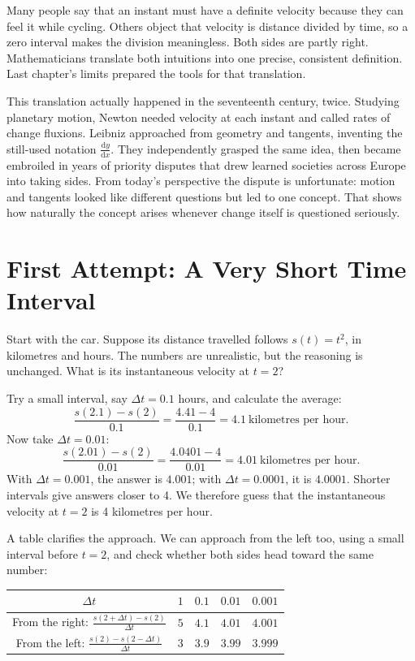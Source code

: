 Many people say that an instant must have a definite velocity because they can feel it while cycling. Others object that velocity is distance divided by time, so a zero interval makes the division meaningless. Both sides are partly right. Mathematicians translate both intuitions into one precise, consistent definition. Last chapter's limits prepared the tools for that translation.

This translation actually happened in the seventeenth century, twice. Studying planetary motion, Newton needed velocity at each instant and called rates of change fluxions. Leibniz approached from geometry and tangents, inventing the still-used notation $\frac{\mathrm{d}y}{\mathrm{d}x}$. They independently grasped the same idea, then became embroiled in years of priority disputes that drew learned societies across Europe into taking sides. From today's perspective the dispute is unfortunate: motion and tangents looked like different questions but led to one concept. That shows how naturally the concept arises whenever change itself is questioned seriously.

\section{First Attempt: A Very Short Time Interval}

Start with the car. Suppose its distance travelled follows $s(t)=t^2$, in kilometres and hours. The numbers are unrealistic, but the reasoning is unchanged. What is its instantaneous velocity at $t=2$?

Try a small interval, say $\Delta t=0.1$ hours, and calculate the average:
\[
\frac{s(2.1)-s(2)}{0.1}=\frac{4.41-4}{0.1}=4.1\ \text{kilometres per hour}.
\]
Now take $\Delta t=0.01$:
\[
\frac{s(2.01)-s(2)}{0.01}=\frac{4.0401-4}{0.01}=4.01\ \text{kilometres per hour}.
\]
With $\Delta t=0.001$, the answer is $4.001$; with $\Delta t=0.0001$, it is $4.0001$. Shorter intervals give answers closer to 4. We therefore guess that the instantaneous velocity at $t=2$ is 4 kilometres per hour.

A table clarifies the approach. We can approach from the left too, using a small interval before $t=2$, and check whether both sides head toward the same number:

\begin{center}
\begin{tabular}{ccccc}
\toprule
$\Delta t$ & $1$ & $0.1$ & $0.01$ & $0.001$ \\
\midrule
From the right: $\frac{s(2+\Delta t)-s(2)}{\Delta t}$ & $5$ & $4.1$ & $4.01$ & $4.001$ \\
From the left: $\frac{s(2)-s(2-\Delta t)}{\Delta t}$ & $3$ & $3.9$ & $3.99$ & $3.999$ \\
\bottomrule
\end{tabular}
\end{center}

